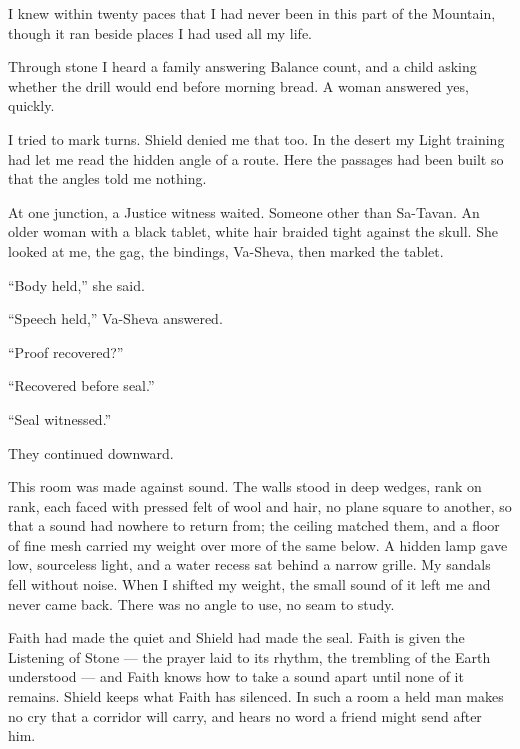 I knew within twenty paces that I had never been in this part of the Mountain, though it ran beside places I had used all my life.\par

Through stone I heard a family answering Balance count, and a child asking whether the drill would end before morning bread. A woman answered yes, quickly.\par

I tried to mark turns. Shield denied me that too. In the desert my Light training had let me read the hidden angle of a route. Here the passages had been built so that the angles told me nothing.\par

At one junction, a Justice witness waited. Someone other than Sa-Tavan. An older woman with a black tablet, white hair braided tight against the skull. She looked at me, the gag, the bindings, Va-Sheva, then marked the tablet.\par

``Body held,'' she said.\par

``Speech held,'' Va-Sheva answered.\par

``Proof recovered?''\par

``Recovered before seal.''\par

``Seal witnessed.''\par

They continued downward.\par

This room was made against sound. The walls stood in deep wedges, rank on rank, each faced with pressed felt of wool and hair, no plane square to another, so that a sound had nowhere to return from; the ceiling matched them, and a floor of fine mesh carried my weight over more of the same below. A hidden lamp gave low, sourceless light, and a water recess sat behind a narrow grille. My sandals fell without noise. When I shifted my weight, the small sound of it left me and never came back. There was no angle to use, no seam to study.\par

Faith had made the quiet and Shield had made the seal. Faith is given the Listening of Stone --- the prayer laid to its rhythm, the trembling of the Earth understood --- and Faith knows how to take a sound apart until none of it remains. Shield keeps what Faith has silenced. In such a room a held man makes no cry that a corridor will carry, and hears no word a friend might send after him.\par

